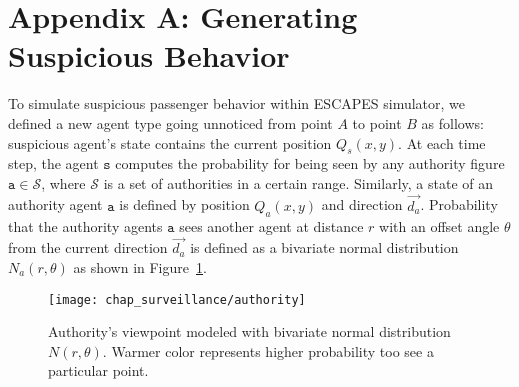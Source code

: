 
\chapter*{\vspace{-2.3cm} \Large Appendix A: Generating Suspicious Behavior \vspace{1.7cm}}
\label{chap:pub}

\fancyhead[LO]{}


To simulate suspicious passenger behavior within ESCAPES simulator, we defined a new agent type going unnoticed from point $A$ to point $B$ as follows: suspicious agent's state contains the current position $Q_s(x,y)$. At each time step, the agent $\mathtt{s}$ computes the probability for being seen by any authority figure $\mathtt{a} \in \mathcal{S}$, where $\mathcal{S}$ is a set of authorities in a certain range. Similarly, a state of an authority agent $\mathtt{a}$ is defined by position $Q_a(x,y)$ and direction $\vec{d_a}$. Probability that the authority agents $\mathtt{a}$ sees another agent at distance $r$ with an offset angle $\theta$ from the current direction $\vec{d_a}$ is defined as a bivariate normal distribution $N_a(r, \theta)$ as shown in Figure~\ref{fig:bivariate}.

\begin{figure}[!ht]
\centering
\texttt{[image: chap\_surveillance/authority]}
\caption{Authority's viewpoint modeled with bivariate normal distribution $N(r, \theta)$. Warmer color represents higher probability too see a particular point.}
\label{fig:bivariate}
\end{figure}

